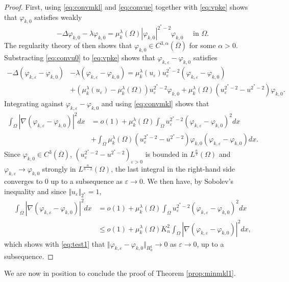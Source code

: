 \documentclass[10pt]{amsart}
\numberwithin{equation}{section}
\newcommand{\ve}{\varepsilon}
\newcommand{\vp}{\varphi}
\newcommand{\Om}{\Omega}
\newcommand{\bal}{\begin{aligned}}
\newcommand{\eal}{\end{aligned}}
\newcommand{\mkl}{\mu_{k}^{\lambda}}
\theoremstyle{plain}
\theoremstyle{remark}
\begin{document}
\begin{proof}
First, using \eqref{eq:convmkl} and \eqref{eq:convue} together with \eqref{eq:vpke} shows that $\vp_{k,0}$ satisfies weakly 
 \begin{equation} \label{eq:convu0}
   - \Delta \vp_{k,0} - \lambda \vp_{k,0} = \mkl(\Om) |\vp_{k,0}|^{2^*-2} \vp_{k,0} \quad \text{ in } \Om. 
   \end{equation}
The regularity theory  of   \cite{BrezisKato} then shows that $\vp_{k,0} \in C^{3,\alpha}(\overline{\Om})$ for some $\alpha >0$. Substracting \eqref{eq:convu0} to \eqref{eq:vpke} shows that $\vp_{k,\ve}-\vp_{k,0}$ satisfies
 $$ \begin{aligned}
   - \Delta (\vp_{k,\ve} - \vp_{k,0}) &- \lambda (\vp_{k,\ve}-\vp_{k,0})  = \mkl(u_\ve) u_\ve^{2^*-2} (\vp_{k,\ve} - \vp_{k,0})  \\
   & + (\mkl(u_\ve) - \mkl(\Om)) u_\ve^{2^*-2} \vp_{k,0} + \mkl(\Om) (u_\ve^{2^*-2} - u^{2^*-2}) \vp_{k,0}. 
   \end{aligned}$$
   Integrating against $\vp_{k,\ve}-\vp_{k,0}$ and using \eqref{eq:convmkl} shows that 
   $$\begin{aligned}
    \int_{\Om} |\nabla (\vp_{k,\ve} - \vp_{k,0})|^2 dx &= o(1) +  \mkl(\Om) \int_\Om u_\ve^{2^*-2} (\vp_{k,\ve} - \vp_{k,0})^2 dx \\
    &+ \int_{\Om}\mkl(\Om) (u_\ve^{2^*-2} - u^{2^*-2}) \vp_{k,0} (\vp_{k,\ve} - \vp_{k,0})dx. 
    \end{aligned} $$
  Since $\vp_{k,0} \in C^3(\overline{\Om})$, $(u_\ve^{2^*-2} - u^{2^*-2})_{\ve >0}$ is bounded in $L^\frac{n}{2}(\Om)$ and $\vp_{k,\ve} \to \vp_{k,0}$ strongly in $L^{\frac{n}{n-2}}(\Om)$, the last integral in the right-hand side converges to $0$ up to a subsequence as $\ve \to 0$. We then have, by Sobolev's inequality and since $\Vert u_\ve \Vert_{2^*} = 1$,
    $$
\bal    \int_{\Om} |\nabla (\vp_{k,\ve} - \vp_{k,0})|^2 dx & = o(1) +  \mkl(\Om) \int_\Om u_\ve^{2^*-2} (\vp_{k,\ve} - \vp_{k,0})^2 dx \\
& \le o(1) + \mkl(\Om) K_n^2 \int_{\Om} |\nabla (\vp_{k,\ve} - \vp_{k,0})|^2 dx, 
\eal$$
which shows with \eqref{eq:test1} that $\Vert \vp_{k,\ve} - \vp_{k,0}\Vert_{H^1_0} \to 0$ as $\ve \to 0$, up to a subsequence. 
\end{proof}

We are now in position to conclude the proof of Theorem \ref{prop:minmkl1}.
\end{document}
